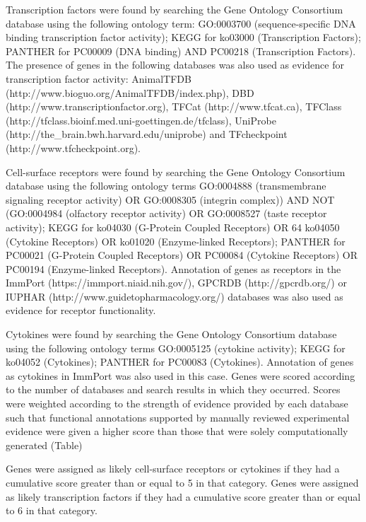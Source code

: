 \begin{sloppypar}
Transcription factors were found by searching the Gene Ontology Consortium database using the following ontology term: GO:0003700 (sequence-specific DNA binding transcription factor activity); KEGG for ko03000 (Transcription Factors); PANTHER for PC00009 (DNA binding) AND PC00218 (Transcription Factors). The presence of genes in the following databases was also used as evidence for transcription factor activity: AnimalTFDB (http://www.bioguo.org/AnimalTFDB/index.php), DBD (http://www.transcriptionfactor.org), TFCat (http://www.tfcat.ca), TFClass (http://tfclass.bioinf.med.uni-goettingen.de/tfclass), UniProbe (http://the\_brain.bwh.harvard.edu/uniprobe) and TFcheckpoint (http://www.tfcheckpoint.org).
\end{sloppypar}

Cell-surface receptors were found by searching the Gene Ontology Consortium database using the following ontology terms GO:0004888 (transmembrane signaling receptor activity) OR GO:0008305 (integrin complex)) AND NOT (GO:0004984 (olfactory receptor activity) OR GO:0008527 (taste receptor activity); KEGG for ko04030 (G-Protein Coupled Receptors) OR 64 ko04050 (Cytokine Receptors) OR ko01020 (Enzyme-linked Receptors); PANTHER for PC00021 (G-Protein Coupled Receptors) OR PC00084 (Cytokine Receptors) OR PC00194 (Enzyme-linked Receptors). Annotation of genes as receptors in the ImmPort (https://immport.niaid.nih.gov/), GPCRDB (http://gpcrdb.org/) or IUPHAR (http://www.guidetopharmacology.org/) databases was also used as evidence for receptor functionality.

Cytokines were found by searching the Gene Ontology Consortium database using the following ontology terms GO:0005125 (cytokine activity); KEGG for ko04052 (Cytokines); PANTHER for PC00083 (Cytokines). Annotation of genes as cytokines in ImmPort was also used in this case. Genes were scored according to the number of databases and search results in which they occurred. Scores were weighted according to the strength of evidence provided by each database such that functional annotations supported by manually reviewed experimental evidence were given a higher score than those that were solely computationally generated (Table)

Genes were assigned as likely cell-surface receptors or cytokines if they had a cumulative score greater than or equal to 5 in that category. Genes were assigned as likely transcription factors if they had a cumulative score greater than or equal to 6 in that category.

